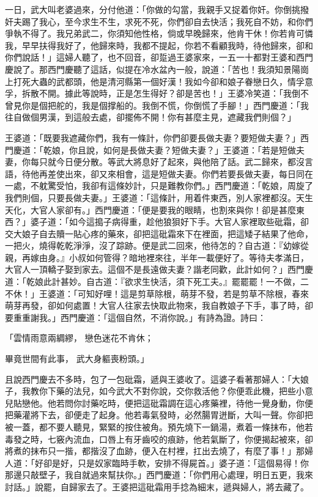 一日，武大叫老婆過來，分付他道：「你做的勾當，我親手又捉着你奸。你倒挑撥奸夫踢了我心，至今求生不生，求死不死，你們卻自去快活；我死自不妨，和你們爭執不得了。我兄弟武二，你須知他性格，倘或早晚歸來，他肯干休！你若肯可憐我，早早扶得我好了，他歸來時，我都不提起，你若不看顧我時，待他歸來，卻和你們說話！」這婦人聽了，也不回音，卻踅過王婆家來，一五一十都對王婆和西門慶說了。那西門慶聽了這話，似提在冷水盆內一般，說道：「苦也！我須知景陽崗上打死大蟲的武都頭，他是清河縣第一個好漢！我如今卻和娘子眷戀日久，情孚意孚，拆散不開。據此等說時，正是怎生得好？卻是苦也！」王婆冷笑道：「我倒不曾見你是個把舵的，我是個撑船的。我倒不慌，你倒慌了手腳！」西門慶道：「我往自做個男漢，到這般去處，卻擺佈不開！你有甚麼主見，遮藏我們則個？」

王婆道：「既要我遮藏你們，我有一條計，你們卻要長做夫妻？要短做夫妻？」西門慶道：「乾娘，你且說，如何是長做夫妻？短做夫妻？」王婆道：「若是短做夫妻，你每只就今日便分散。等武大將息好了起來，與他陪了話。武二歸來，都沒言語，待他再差使出來，卻又來相會，這是短做夫妻。你們若要長做夫妻，每日同在一處，不躭驚受怕，我卻有這條妙計，只是難教你們。」西門慶道：「乾娘，周旋了我們則個，只要長做夫妻。」王婆道：「這條計，用着件東西，別人家裡都沒。天生天化，大官人家卻有。」西門慶道：「便是要我的眼睛，也割來與你！卻是甚麼東西？」婆子道：「如今這搗子病得重，趁他狼狽好下手。大官人家裡取些砒霜，卻交大娘子自去贖一貼心疼的藥來，卻把這砒霜來下在裡面，把這矮子結果了他命，一把火，燒得乾乾淨淨，沒了踪跡。便是武二回來，他待怎的？自古道：『幼嫁從親，再嫁由身。』小叔如何管得？暗地裡來往，半年一載便好了。等待夫孝滿日，大官人一頂轎子娶到家去。這個不是長遠做夫妻？諧老同歡，此計如何？」西門慶道：「乾娘此計甚妙。自古道：『欲求生快活，須下死工夫。』罷罷罷！一不做，二不休！」王婆道：「可知好哩！這是剪草除根，萌芽不發，若是剪草不除根，春來萌芽再發，卻如何處置！大官人往家去快取此物來，我自教娘子下手，事了時，卻要重重謝我。」西門慶道：「這個自然，不消你說。」有詩為證。詩曰：

「雲情雨意兩綢繆，  戀色迷花不肯休；

畢竟世間有此事，  武大身軀喪粉頭。」

且說西門慶去不多時，包了一包砒霜，遞與王婆收了。這婆子看著那婦人：「大娘子，我教你下藥的法兒，如今武大不對你說，交你救活他？你便乖此機，把些小意兒貼戀他。他若問你討藥吃時，便把這砒霜調在這心疼藥裡，待他一覺身動，你便把藥灌將下去，卻便走了起身。他若毒氣發時，必然腸胃迸斷，大叫一聲。你卻把被一蓋，都不要人聽見，緊緊的按住被角。預先燒下一鍋湯，煮着一條抹布，他若毒發之時，七竅內流血，口唇上有牙齒咬的痕跡，他若氣斷了，你便揭起被來，卻將煮的抹布只一揩，都揩沒了血跡，便入在村裡，扛出去燒了，有麼了事！」那婦人道：「好卻是好，只是奴家臨時手軟，安排不得屍首。」婆子道：「這個易得！你那邊只敲壁子，我自就過來幫扶你。」西門慶道：「你們用心處理，明日五更，我來討話。」說罷，自歸家去了。王婆把這砒霜用手捻為細末，遞與婦人，將去藏了。

